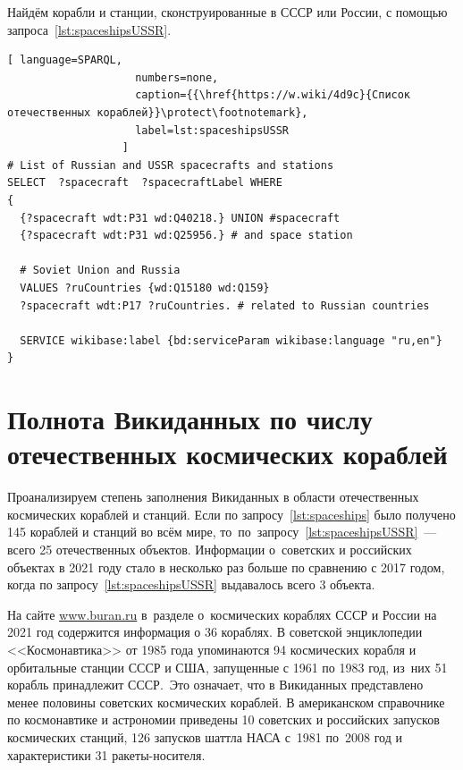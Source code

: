 Найдём корабли и станции, сконструированные в СССР или России, 
с помощью запроса~\ref{lst:spaceshipsUSSR}.

\begin{lstlisting}[ language=SPARQL, 
                    numbers=none, 
                    caption={{\href{https://w.wiki/4d9c}{Список отечественных кораблей}}\protect\footnotemark}, 
                    label=lst:spaceshipsUSSR
                  ]
# List of Russian and USSR spacecrafts and stations
SELECT  ?spacecraft  ?spacecraftLabel WHERE
{
  {?spacecraft wdt:P31 wd:Q40218.} UNION #spacecraft
  {?spacecraft wdt:P31 wd:Q25956.} # and space station
  
  # Soviet Union and Russia
  VALUES ?ruCountries {wd:Q15180 wd:Q159}
  ?spacecraft wdt:P17 ?ruCountries. # related to Russian countries
  
  SERVICE wikibase:label {bd:serviceParam wikibase:language "ru,en"}
}
\end{lstlisting}



\section{Полнота Викиданных по числу отечественных космических кораблей}

Проанализируем степень заполнения Викиданных в области отечественных космических кораблей и станций. 
Если по запросу~\ref{lst:spaceships} было получено 145 кораблей и станций во всём мире, 
то~по~запросу~\ref{lst:spaceshipsUSSR}~--- всего 25 отечественных объектов. 
Информации о~советских и российских объектах в 2021 году 
стало в несколько раз больше по сравнению с 2017 годом, 
когда по запросу~\ref{lst:spaceshipsUSSR} выдавалось всего 3 объекта. 

На сайте \href{https://www.buran.ru/htm/homepage.htm}
              {www.buran.ru} 
в~разделе о~космических кораблях СССР и России на 2021 год 
содержится информация о 36 кораблях. %
В советской энциклопедии <<Космонавтика>> от 1985 года упоминаются 
94 космических корабля и орбитальные станции СССР и США, 
запущенные с 1961 по 1983 год, 
из~них 51 корабль принадлежит СССР\autocite[498]{spacecraftCosmonavtika}.\, 
Это означает, что в Викиданных представлено менее половины советских космических кораблей. 
В американском справочнике по космонавтике и астрономии 
приведены 10 советских и российских запусков космических станций, %
126 запусков шаттла НАСА с~1981 по~2008 год %
и характеристики 31 ракеты-носителя\autocite{spacecraftSAA}.   %




